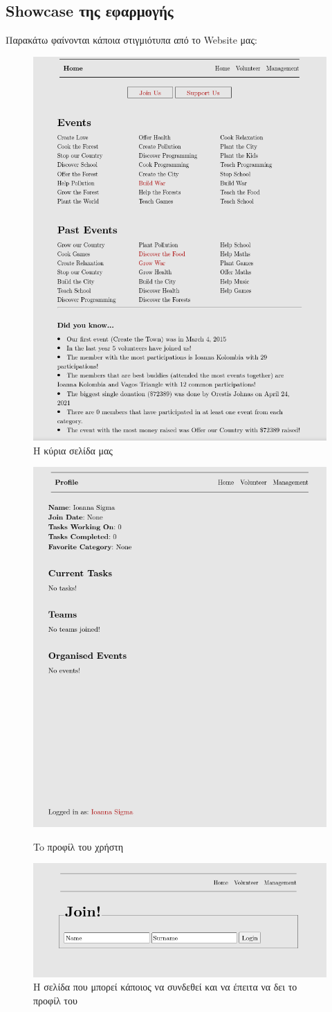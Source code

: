 \documentclass[manuscript,screen,review]{acmart}
\newcommand{\en}[1]{\foreignlanguage{english}{#1}}
\begin{document}
\subsection{\en{Showcase} της εφαρμογής}
Παρακάτω φαίνονται κάποια στιγμιότυπα από το \en{Website} μας:

\begin{figure}[H]
    \centering
    \includegraphics[width=.7\textwidth]{./images/homepage.png}
    \caption{H κύρια σελίδα μας}
\end{figure}

\begin{figure}[H]
    \centering
    \includegraphics[width=.5\textwidth]{./images/profile.png}
    \caption{To προφίλ του χρήστη}
    \includegraphics[width=.5\textwidth]{./images/join.png}
    \caption{Η σελίδα που μπορεί κάποιος να συνδεθεί και να έπειτα να δει το προφίλ του}
\end{figure}
\end{document}
